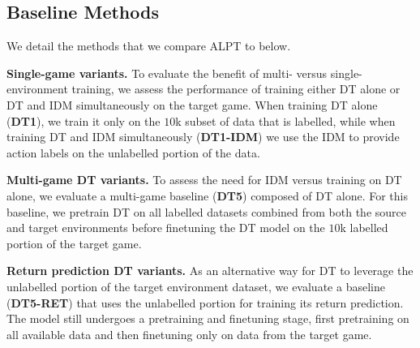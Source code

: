 \documentclass{article} %
\begin{document}
\subsection{Baseline Methods}
We detail the methods that we compare ALPT to below.

\textbf{Single-game variants.}  To evaluate the benefit of multi- versus single-environment training, we assess the performance of training either DT alone or DT and IDM simultaneously on the target game. When training DT alone (\textbf{DT1}), we train it only on the $10$k subset of data that is labelled, while when training DT and IDM simultaneously (\textbf{DT1-IDM}) we use the IDM to provide action labels on the unlabelled portion of the data. 

\textbf{Multi-game DT variants.} To assess the need for IDM versus training on DT alone, we evaluate a multi-game baseline (\textbf{DT5}) composed of DT alone. For this baseline, we pretrain DT on all labelled datasets combined from both the source and target environments before finetuning the DT model on the $10$k labelled portion of the target game. %

\textbf{Return prediction DT variants.} As an alternative way for DT to leverage the unlabelled portion of the target environment dataset, we evaluate a baseline (\textbf{DT5-RET}) that uses the unlabelled portion for training its return prediction. 
The model still undergoes a pretraining and finetuning stage, first pretraining on all available data and then finetuning only on data from the target game.
\end{document}
